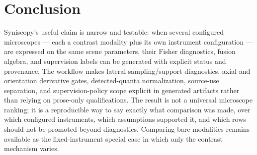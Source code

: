 \section{Conclusion}

Syniscopy's useful claim is narrow and testable: when several configured microscopes --- each a contrast modality plus its own instrument configuration --- are expressed on the same scene parameters, their Fisher diagnostics, fusion algebra, and supervision labels can be generated with explicit status and provenance. The workflow makes lateral sampling/support diagnostics, axial and orientation derivative gates, detected-quanta normalization, source-use separation, and supervision-policy scope explicit in generated artifacts rather than relying on prose-only qualifications. The result is not a universal microscope ranking; it is a reproducible way to say exactly what comparison was made, over which configured instruments, which assumptions supported it, and which rows should not be promoted beyond diagnostics. Comparing bare modalities remains available as the fixed-instrument special case in which only the contrast mechanism varies.
